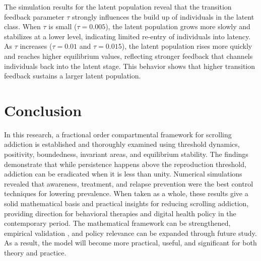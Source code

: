 \documentclass[10pt]{NSP1}
\begin{document}
	The simulation results for the latent population reveal that the transition feedback parameter $\tau$ strongly influences the build up of individuals in the latent class. When $\tau$ is small ($\tau=0.005$), the latent population grows more slowly and stabilizes at a lower level, indicating limited re-entry of individuals into latency. As $\tau$ increases ($\tau=0.01$ and $\tau=0.015$), the latent population rises more quickly and reaches higher equilibrium values, reflecting stronger feedback that channels individuals back into the latent stage. This behavior shows that higher transition feedback sustains a larger latent population.
	
	\section{Conclusion}
	
	In this research, a fractional order compartmental framework for scrolling addiction is established and thoroughly examined using threshold dynamics, positivity, boundedness, invariant areas, and equilibrium stability. The findings demonstrate that while persistence happens above the reproduction threshold, addiction can be eradicated when it is less than unity. Numerical simulations revealed that awareness, treatment, and relapse prevention were the best control techniques for lowering prevalence. When taken as a whole, these results give a solid mathematical basis and practical insights for reducing scrolling addiction, providing direction for behavioral therapies and digital health policy in the contemporary period. The mathematical framework can be strengthened, empirical validation , and policy relevance can be expanded through future study. As a result, the model will become more practical, useful, and significant for both theory and practice.
	
\end{document}
